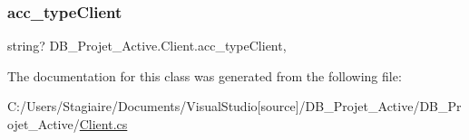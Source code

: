 \subsubsection{\texorpdfstring{acc\_typeClient}{acc\_typeClient}}
{\footnotesize\ttfamily string? D\+B\+\_\+\+Projet\+\_\+\+Active.\+Client.\+acc\+\_\+type\+Client\hspace{0.3cm}{\ttfamily [get]}, {\ttfamily [set]}}



The documentation for this class was generated from the following file\+:\begin{DoxyCompactItemize}
\item 
C\+:/\+Users/\+Stagiaire/\+Documents/\+Visual\+Studio\mbox{[}source\mbox{]}/\+D\+B\+\_\+\+Projet\+\_\+\+Active/\+D\+B\+\_\+\+Projet\+\_\+\+Active/\mbox{\hyperlink{_client_8cs}{Client.\+cs}}\end{DoxyCompactItemize}
